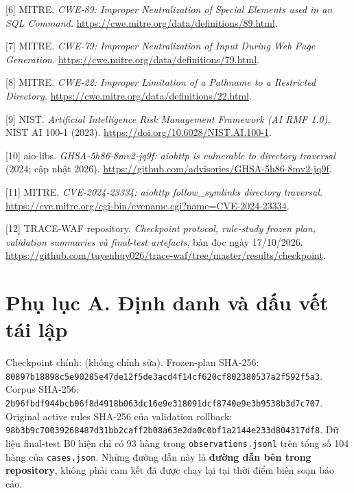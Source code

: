 \documentclass[
  10pt,
  a4paper,
]{article}
\begin{document}
{[}6{]} MITRE. \emph{CWE-89: Improper Neutralization of Special Elements
used in an SQL Command.}
\url{https://cwe.mitre.org/data/definitions/89.html}.

{[}7{]} MITRE. \emph{CWE-79: Improper Neutralization of Input During Web
Page Generation.} \url{https://cwe.mitre.org/data/definitions/79.html}.

{[}8{]} MITRE. \emph{CWE-22: Improper Limitation of a Pathname to a
Restricted Directory.}
\url{https://cwe.mitre.org/data/definitions/22.html}.

{[}9{]} NIST. \emph{Artificial Intelligence Risk Management Framework
(AI RMF 1.0)}, NIST AI 100-1 (2023).
\url{https://doi.org/10.6028/NIST.AI.100-1}.

{[}10{]} aio-libs. \emph{GHSA-5h86-8mv2-jq9f: aiohttp is vulnerable to
directory traversal} (2024; cập nhật 2026).
\url{https://github.com/advisories/GHSA-5h86-8mv2-jq9f}.

{[}11{]} MITRE. \emph{CVE-2024-23334: aiohttp follow\_symlinks directory
traversal.}
\url{https://cve.mitre.org/cgi-bin/cvename.cgi?name=CVE-2024-23334}.

{[}12{]} TRACE-WAF repository. \emph{Checkpoint protocol, rule-study
frozen plan, validation summaries và final-test artefacts}, bản đọc ngày
17/10/2026.
\url{https://github.com/tuyenhuy026/trace-waf/tree/master/results/checkpoint}.

\section{Phụ lục A. Định danh và dấu vết tái
lập}\label{phux1ee5-lux1ee5c-a.-ux111ux1ecbnh-danh-vuxe0-dux1ea5u-vux1ebft-tuxe1i-lux1eadp}

Checkpoint chính:
 (không
chỉnh sửa). Frozen-plan SHA-256:
\texttt{80897b18898c5e90\allowbreak{}285e47de12f5de3a\allowbreak{}cd4f14cf620cf802\allowbreak{}380537a2f592f5a3}.
Corpus SHA-256:
\texttt{2b96fbdf944bcb06\allowbreak{}f8d4918b063dc16e\allowbreak{}9e318091dcf8740e\allowbreak{}9e3b9538b3d7c707}.
Original active rules SHA-256 của validation rollback:
\texttt{98b3b9c700392684\allowbreak{}87d31bb2caff2b08\allowbreak{}a63e2da0c0bf1a21\allowbreak{}44e233d804317df8}.
Dữ liệu final-test B0 hiện chỉ có 93 hàng trong
\texttt{observations.jsonl} trên tổng số 104 hàng của
\texttt{cases.json}. Những đường dẫn này là \textbf{đường dẫn bên trong
repository}, không phải cam kết đã được chạy lại tại thời điểm biên soạn
báo cáo.
\end{document}
